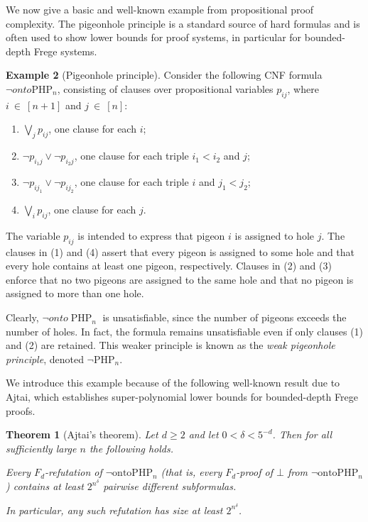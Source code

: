 \documentclass{article}
\theoremstyle{plain}
\newtheorem{theorem}{Theorem}[section]
\theoremstyle{definition}
\newtheorem{example}[theorem]{Example}
\begin{document}
We now give a basic and well-known example from propositional proof complexity.
The pigeonhole principle is a standard source of hard formulas and is often used
to show lower bounds for proof systems, in particular for bounded-depth Frege systems.


\begin{example}[Pigeonhole principle]\label{ex:pigeonhole}
 Consider the following CNF formula $\lnot onto\mathrm{PHP}_n$, consisting of clauses
over propositional variables $p_{ij}$, where \linebreak $i~\in~ [n+1]$ and $j ~\in~[n]$:
\begin{enumerate}
  \item $\bigvee_j p_{ij}$, one clause for each $i$;
  \item $\lnot p_{i_1 j} \lor \lnot p_{i_2 j}$, one clause for each triple
        $i_1 < i_2$ and $j$;
  \item $\lnot p_{i j_1} \lor \lnot p_{i j_2}$, one clause for each triple
        $i$ and $j_1 < j_2$;
  \item $\bigvee_i p_{ij}$, one clause for each $j$.
\end{enumerate}

The variable $p_{ij}$ is intended to express that pigeon $i$ is assigned to hole $j$.
The clauses in (1) and (4) assert that every pigeon is assigned to some hole and that
every hole contains at least one pigeon, respectively. Clauses in (2) and (3) enforce
that no two pigeons are assigned to the same hole and that no pigeon is assigned to
more than one hole.

Clearly, $\neg onto\operatorname{PHP}_n$ is unsatisfiable, since the number of pigeons exceeds the number of holes.  In fact, the formula remains unsatisfiable even if only clauses
(1) and (2) are retained. This weaker principle is known as the \emph{weak pigeonhole
principle}, denoted $\lnot \mathrm{PHP}_n$.

We introduce this example because of the following well-known result due to Ajtai,
which establishes super-polynomial lower bounds for bounded-depth Frege proofs.

\begin{theorem}[Ajtai’s theorem]\cite{Ajtai1988}\label{thm:ajtai}
Let $d \ge 2$ and let $0 < \delta < 5^{-d}$. Then for all sufficiently large $n$ the following holds.


Every $F_d$-refutation of $\lnot \mathrm{ontoPHP}_n$ (that is, every $F_d$-proof of $\bot$ from
\linebreak$\lnot \mathrm{ontoPHP}_n$) contains at least $2^{n^\delta}$ pairwise different subformulas.

In particular, any such refutation has size at least $2^{n^\delta}$.
\end{theorem}

\end{example}
\end{document}
